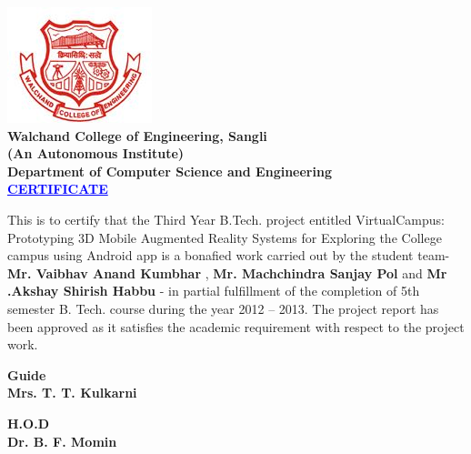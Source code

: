 \documentclass{article}
\begin{document}
\newpage
{	
\linespread{1.6}

	\begin{center}
		\includegraphics[width=.2\linewidth]{walchand.jpg}\\[.5cm]
		\textbf{\Large Walchand College of Engineering, Sangli }\\
		\textbf {(An Autonomous Institute)}\\[.5cm]
		 \textbf {\LARGE Department of Computer Science and Engineering}\\[1cm]
		\huge \textbf{\textcolor{blue}{\underline{CERTIFICATE}}}\\[1cm]
	\end{center}
		\par \large This is to certify that the Third Year B.Tech. project entitled VirtualCampus: Prototyping 3D Mobile Augmented Reality Systems for Exploring the College campus using Android app is a bonafied work carried out by the student team- 
	\textbf{ Mr. Vaibhav Anand Kumbhar}  , \textbf{ Mr. Machchindra Sanjay Pol } and \textbf{  Mr .Akshay Shirish Habbu }  - 
in partial fulfillment of the completion of 5th semester B. Tech. course during the year 2012 – 2013. The project report has been approved as it satisfies the academic requirement with respect to the project work.\\[2cm]
\vfill
\begin{minipage}{.5\linewidth}
	\begin{flushleft}
		\textbf{Guide}\\
		\textbf{Mrs. T. T. Kulkarni}\\
	\end{flushleft}
\end{minipage}
\begin{minipage}{.5\linewidth}
	\begin{flushright}
	
	\textbf{H.O.D}\\
	\textbf{Dr. B. F. Momin}\\
	\end{flushright}
\end{minipage}


}
\end{document}

